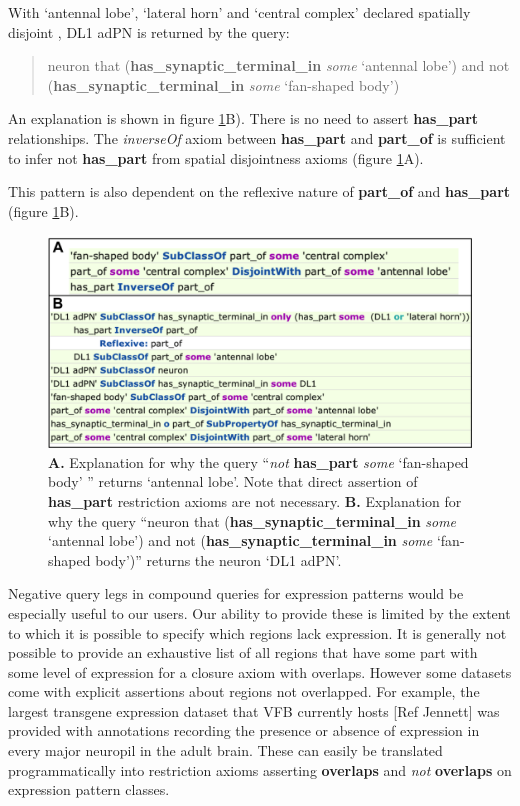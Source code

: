 \documentclass[runningheads,a4paper]{llncs}
\begin{document}
With `antennal lobe', `lateral horn' and  `central complex' declared
spatially disjoint , DL1 adPN is returned by the query:

\begin{quote}
neuron that (\textbf{has\_synaptic\_terminal\_in} \textit{some}
`antennal lobe') and not (\textbf{has\_synaptic\_terminal\_in}
\textit{some} `fan-shaped body')
\end{quote}

An explanation is shown in figure \ref{fig:combined_explanation}B).  There is no need to
assert \textbf{has\_part} relationships. The
\textit{inverseOf} axiom between \textbf{has\_part} and
\textbf{part\_of} is sufficient to infer not \textbf{has\_part} from
spatial disjointness axioms (figure \ref{fig:combined_explanation}A).

This pattern is also dependent on the reflexive nature of
\textbf{part\_of} and \textbf{has\_part} (figure \ref{fig:combined_explanation}B).

\begin{figure}
\centering
\includegraphics[width=120mm]{images/combined_explanation.png}
\caption{\textbf{A.} Explanation for why the query ``\textit{not}
   \textbf{has\_part} \textit{some} `fan-shaped body' '' returns
   `antennal lobe'.  Note that direct assertion of \textbf{has\_part}
   restriction axioms are not necessary. \textbf{B.} Explanation for
   why the query ``neuron that (\textbf{has\_synaptic\_terminal\_in}
   \textit{some} `antennal lobe') and not
   (\textbf{has\_synaptic\_terminal\_in} \textit{some} `fan-shaped
   body')'' returns the neuron `DL1 adPN'. }
\label{fig:combined_explanation}
\end{figure}

Negative query legs in compound queries for expression patterns would
be especially useful to our users.  Our ability to provide these is
limited by the extent to which it is possible to specify which regions
lack expression.  It is generally not possible to provide an
exhaustive list of all regions that have some part with some level of
expression for a closure axiom with overlaps.  However some datasets
come with explicit assertions about regions not overlapped.  For
example, the largest transgene expression dataset that VFB currently
hosts [Ref Jennett] was provided with annotations recording the
presence or absence of expression in every major neuropil in the adult
brain.  These can easily be translated programmatically into restriction axioms
asserting \textbf{overlaps} and \textit{not} \textbf{overlaps} on
expression pattern classes. %
\end{document}

